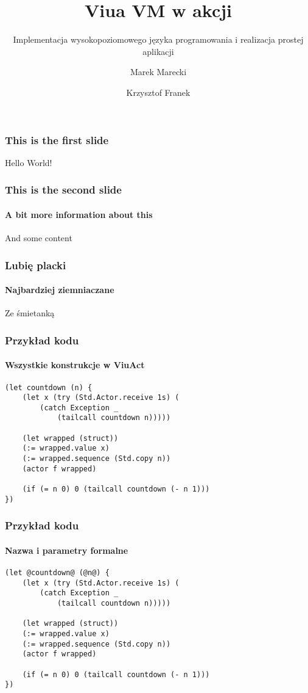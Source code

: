\documentclass{beamer}
\title{Viua VM w akcji}
\subtitle{Implementacja wysokopoziomowego języka programowania i realizacja prostej aplikacji}
\author{Marek Marecki \and Krzysztof Franek}
\begin{document}

\frame{\titlepage}

\begin{frame}
    \frametitle{This is the first slide}

    Hello World!
\end{frame}

\begin{frame}
    \frametitle{This is the second slide}
    \framesubtitle{A bit more information about this}

    And some content
\end{frame}

\begin{frame}
    \frametitle{Lubię placki}
    \framesubtitle{Najbardziej ziemniaczane}

    Ze śmietanką
\end{frame}

\begin{frame}[fragile]
    \frametitle{Przykład kodu}
    \framesubtitle{Wszystkie konstrukcje w ViuAct}

    \begin{small}
    \begin{lstlisting}
(let countdown (n) {
    (let x (try (Std.Actor.receive 1s) (
        (catch Exception _
            (tailcall countdown n)))))

    (let wrapped (struct))
    (:= wrapped.value x)
    (:= wrapped.sequence (Std.copy n))
    (actor f wrapped)

    (if (= n 0) 0 (tailcall countdown (- n 1)))
})
    \end{lstlisting}
    \end{small}
\end{frame}

\begin{frame}[fragile]
    \frametitle{Przykład kodu}
    \framesubtitle{Nazwa i parametry formalne}

    \begin{small}
    \begin{lstlisting}
(let @countdown@ (@n@) {
    (let x (try (Std.Actor.receive 1s) (
        (catch Exception _
            (tailcall countdown n)))))

    (let wrapped (struct))
    (:= wrapped.value x)
    (:= wrapped.sequence (Std.copy n))
    (actor f wrapped)

    (if (= n 0) 0 (tailcall countdown (- n 1)))
})
    \end{lstlisting}
    \end{small}
\end{frame}
\end{document}
